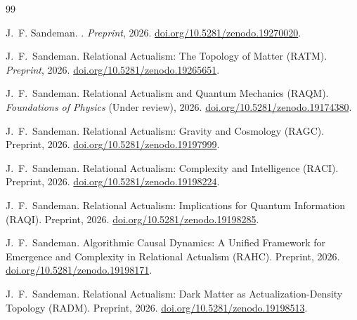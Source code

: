 \documentclass[11pt,a4paper]{article}
\theoremstyle{plain}
\theoremstyle{definition}
\theoremstyle{remark}
\begin{document}

\begin{thebibliography}{99}

J.~F. Sandeman.
.
\newblock \textit{Preprint}, 2026.
\newblock \href{https://doi.org/10.5281/zenodo.19270020}{doi.org/10.5281/zenodo.19270020}.


J.~F.~Sandeman.
\newblock Relational Actualism: The Topology of Matter ({RATM}).
\newblock \textit{Preprint}, 2026.
\newblock \href{https://doi.org/10.5281/zenodo.19265651}{doi.org/10.5281/zenodo.19265651}.

J.~F.~Sandeman.
\newblock Relational Actualism and Quantum Mechanics ({RAQM}).
\newblock \textit{Foundations of Physics} (Under review), 2026.
\newblock \href{https://doi.org/10.5281/zenodo.19174380}{doi.org/10.5281/zenodo.19174380}.

J.~F.~Sandeman.
\newblock Relational Actualism: Gravity and Cosmology ({RAGC}).
\newblock Preprint, 2026.
\newblock \href{https://doi.org/10.5281/zenodo.19197999}{doi.org/10.5281/zenodo.19197999}.

J.~F.~Sandeman.
\newblock Relational Actualism: Complexity and Intelligence ({RACI}).
\newblock Preprint, 2026.
\newblock \href{https://doi.org/10.5281/zenodo.19198224}{doi.org/10.5281/zenodo.19198224}.

J.~F.~Sandeman.
\newblock Relational Actualism: Implications for Quantum Information ({RAQI}).
\newblock Preprint, 2026.
\newblock \href{https://doi.org/10.5281/zenodo.19198285}{doi.org/10.5281/zenodo.19198285}.

J.~F.~Sandeman.
\newblock Algorithmic Causal Dynamics: A Unified Framework for Emergence
  and Complexity in Relational Actualism ({RAHC}).
\newblock Preprint, 2026.
\newblock \href{https://doi.org/10.5281/zenodo.19198171}{doi.org/10.5281/zenodo.19198171}.

J.~F.~Sandeman.
\newblock Relational Actualism: Dark Matter as Actualization-Density
  Topology ({RADM}).
\newblock Preprint, 2026.
\newblock \href{https://doi.org/10.5281/zenodo.19198513}{doi.org/10.5281/zenodo.19198513}.


\end{thebibliography}
\end{document}
